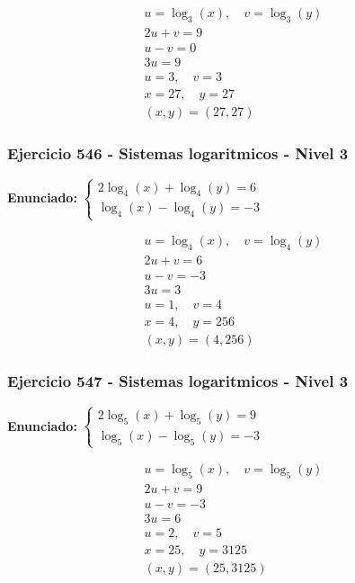 \documentclass[12pt,a4paper]{article}
\begin{document}
\[
\begin{aligned}
u=\log_{3}\left(x\right),\quad v=\log_{3}\left(y\right)\\
2u+v=9\\
u-v=0\\
3u=9\\
u=3,\quad v=3\\
x=27,\quad y=27\\
\boxed{(x,y)=(27,27)}
\end{aligned}
\]


\subsubsection*{Ejercicio 546 - Sistemas logaritmicos - Nivel 3}
\textbf{Enunciado:} \(\begin{cases} 2\log_{4}\left(x\right)+\log_{4}\left(y\right)=6\\ \log_{4}\left(x\right)-\log_{4}\left(y\right)=-3\end{cases}\)

\[
\begin{aligned}
u=\log_{4}\left(x\right),\quad v=\log_{4}\left(y\right)\\
2u+v=6\\
u-v=-3\\
3u=3\\
u=1,\quad v=4\\
x=4,\quad y=256\\
\boxed{(x,y)=(4,256)}
\end{aligned}
\]


\subsubsection*{Ejercicio 547 - Sistemas logaritmicos - Nivel 3}
\textbf{Enunciado:} \(\begin{cases} 2\log_{5}\left(x\right)+\log_{5}\left(y\right)=9\\ \log_{5}\left(x\right)-\log_{5}\left(y\right)=-3\end{cases}\)

\[
\begin{aligned}
u=\log_{5}\left(x\right),\quad v=\log_{5}\left(y\right)\\
2u+v=9\\
u-v=-3\\
3u=6\\
u=2,\quad v=5\\
x=25,\quad y=3125\\
\boxed{(x,y)=(25,3125)}
\end{aligned}
\]
\end{document}
